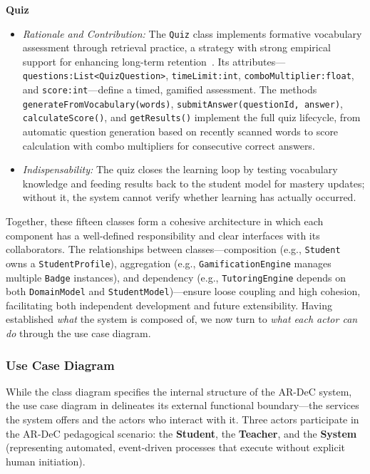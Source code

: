 \medskip
\textbf{Quiz}
\begin{itemize}
\item \textit{Rationale and Contribution:} The \texttt{Quiz} class implements formative vocabulary assessment through retrieval practice, a strategy with strong empirical support for enhancing long-term retention~\cite{Nation2013}. Its attributes---\texttt{questions:List<QuizQuestion>}, \texttt{timeLimit:int}, \texttt{comboMultiplier:float}, and \texttt{score:int}---define a timed, gamified assessment. The methods \texttt{generateFromVocabulary(words)}, \texttt{submitAnswer(questionId, answer)}, \texttt{calculateScore()}, and \texttt{getResults()} implement the full quiz lifecycle, from automatic question generation based on recently scanned words to score calculation with combo multipliers for consecutive correct answers.
\item \textit{Indispensability:} The quiz closes the learning loop by testing vocabulary knowledge and feeding results back to the student model for mastery updates; without it, the system cannot verify whether learning has actually occurred.
\end{itemize}

\bigskip

Together, these fifteen classes form a cohesive architecture in which each component has a well-defined responsibility and clear interfaces with its collaborators. The relationships between classes---composition (e.g., \texttt{Student} owns a \texttt{StudentProfile}), aggregation (e.g., \texttt{GamificationEngine} manages multiple \texttt{Badge} instances), and dependency (e.g., \texttt{TutoringEngine} depends on both \texttt{DomainModel} and \texttt{StudentModel})---ensure loose coupling and high cohesion, facilitating both independent development and future extensibility. Having established \emph{what} the system is composed of, we now turn to \emph{what each actor can do} through the use case diagram.

\subsubsection{Use Case Diagram}
\label{sec:usecase}

While the class diagram specifies the internal structure of the AR-DeC system, the use case diagram in  delineates its external functional boundary---the services the system offers and the actors who interact with it. Three actors participate in the AR-DeC pedagogical scenario: the \textbf{Student}, the \textbf{Teacher}, and the \textbf{System} (representing automated, event-driven processes that execute without explicit human initiation).

